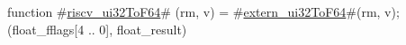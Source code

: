 function #\hyperref[sailRISCVzriscvzyui32ToF64]{riscv\_ui32ToF64}# (rm, v) = {
  #\hyperref[sailRISCVzexternzyui32ToF64]{extern\_ui32ToF64}#(rm, v);
  (float_fflags[4 .. 0], float_result)
}
